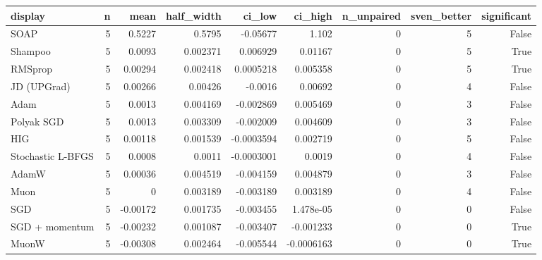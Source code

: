 \begin{tabular}{lrrrrrrrr}
\toprule
display & n & mean & half\_width & ci\_low & ci\_high & n\_unpaired & sven\_better & significant \\
\midrule
SOAP & 5 & 0.5227 & 0.5795 & -0.05677 & 1.102 & 0 & 5 & False \\
Shampoo & 5 & 0.0093 & 0.002371 & 0.006929 & 0.01167 & 0 & 5 & True \\
RMSprop & 5 & 0.00294 & 0.002418 & 0.0005218 & 0.005358 & 0 & 5 & True \\
JD (UPGrad) & 5 & 0.00266 & 0.00426 & -0.0016 & 0.00692 & 0 & 4 & False \\
Adam & 5 & 0.0013 & 0.004169 & -0.002869 & 0.005469 & 0 & 3 & False \\
Polyak SGD & 5 & 0.0013 & 0.003309 & -0.002009 & 0.004609 & 0 & 3 & False \\
HIG & 5 & 0.00118 & 0.001539 & -0.0003594 & 0.002719 & 0 & 5 & False \\
Stochastic L-BFGS & 5 & 0.0008 & 0.0011 & -0.0003001 & 0.0019 & 0 & 4 & False \\
AdamW & 5 & 0.00036 & 0.004519 & -0.004159 & 0.004879 & 0 & 3 & False \\
Muon & 5 & 0 & 0.003189 & -0.003189 & 0.003189 & 0 & 4 & False \\
SGD & 5 & -0.00172 & 0.001735 & -0.003455 & 1.478e-05 & 0 & 0 & False \\
SGD + momentum & 5 & -0.00232 & 0.001087 & -0.003407 & -0.001233 & 0 & 0 & True \\
MuonW & 5 & -0.00308 & 0.002464 & -0.005544 & -0.0006163 & 0 & 0 & True \\
\bottomrule
\end{tabular}
